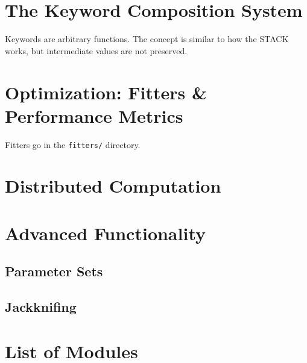 \documentclass[letterpaper]{report}
\newcommand{\matlab}[1]{\texttt{#1}}
\begin{document}
\chapter{The Keyword Composition System}

Keywords are arbitrary functions. The concept is similar to how the STACK works, but intermediate values are not preserved. 

\chapter{Optimization: Fitters \& Performance Metrics}

Fitters go in the \matlab{fitters/} directory. 

\chapter{Distributed Computation}

\chapter{Advanced Functionality}

\section{Parameter Sets}

\section{Jackknifing}



\chapter{List of Modules}
\end{document}
